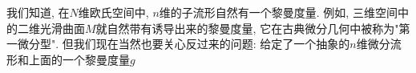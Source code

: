 

我们知道, 在$N$维欧氏空间中, $n$维的子流形自然有一个黎曼度量. 例如, 三维空间中的二维光滑曲面$M$就自然带有诱导出来的黎曼度量, 它在古典微分几何中被称为"第一微分型". 但我们现在当然也要关心反过来的问题: 给定了一个抽象的$n$维微分流形和上面的一个黎曼度量$g$